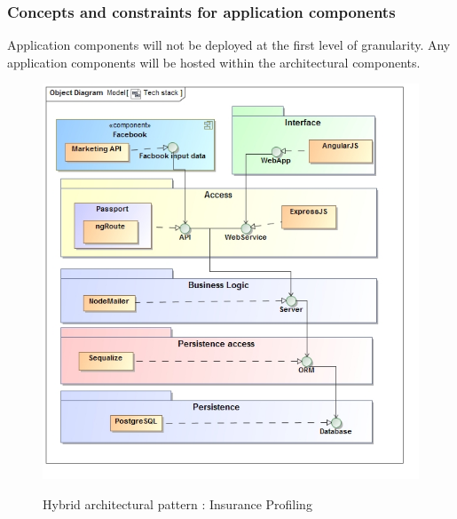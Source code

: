\documentclass{article}
\begin{document}
	\subsubsection{Concepts and constraints for application components}
	Application components will not be deployed at the first level of granularity. Any application components will be hosted within the architectural components.
	\begin{figure}[H]
		\includegraphics[width=\textwidth]{images/obj__Tech_stack.jpg}  \\
		\caption{Hybrid architectural pattern : Insurance Profiling}
		\label{fig:techstack}
	\end{figure}
\end{document}
